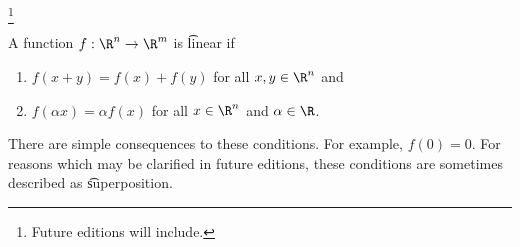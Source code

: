 
  \ifhmode\unskip\fi\footnote{
Future editions will include.
  }

A function $f: \R^n \to \R^m$ is \t{linear} if
  \begin{enumerate}
  \item $f(x + y) = f(x) + f(y)$ for all $x, y \in \R^n$ and
  \item $f(\alpha x) = \alpha f(x)$ for all $x \in \R^n$ and $\alpha \in \R$.
  \end{enumerate}
There are simple consequences to these conditions.
For example, $f(0) =0$.
For reasons which may be clarified in future editions, these conditions are sometimes described as \t{superposition}.

\blankpage
